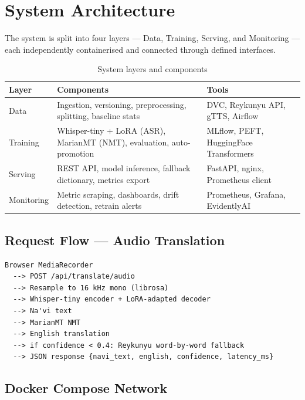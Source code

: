 \documentclass[12pt,a4paper]{article}
\begin{document}
\section{System Architecture}

The system is split into four layers --- Data, Training, Serving, and Monitoring ---
each independently containerised and connected through defined interfaces.

\begin{table}[H]
  \centering
  \caption{System layers and components}
  \begin{tabular}{@{}L{2.2cm}L{7cm}L{5cm}@{}}
    \toprule
    \textbf{Layer} & \textbf{Components} & \textbf{Tools} \\
    \midrule
    Data      & Ingestion, versioning, preprocessing, splitting, baseline stats
              & DVC, Reykunyu API, gTTS, Airflow \\
    Training  & Whisper-tiny + LoRA (ASR), MarianMT (NMT), evaluation, auto-promotion
              & MLflow, PEFT, HuggingFace Transformers \\
    Serving   & REST API, model inference, fallback dictionary, metrics export
              & FastAPI, nginx, Prometheus client \\
    Monitoring& Metric scraping, dashboards, drift detection, retrain alerts
              & Prometheus, Grafana, EvidentlyAI \\
    \bottomrule
  \end{tabular}
\end{table}

\subsection{Request Flow --- Audio Translation}

\begin{lstlisting}
Browser MediaRecorder
  --> POST /api/translate/audio
  --> Resample to 16 kHz mono (librosa)
  --> Whisper-tiny encoder + LoRA-adapted decoder
  --> Na'vi text
  --> MarianMT NMT
  --> English translation
  --> if confidence < 0.4: Reykunyu word-by-word fallback
  --> JSON response {navi_text, english, confidence, latency_ms}
\end{lstlisting}

\subsection{Docker Compose Network}
\end{document}
